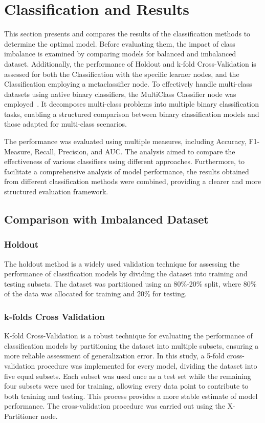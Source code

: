 \section{Classification and Results}
This section presents and compares the results of the classification methods to determine the optimal model. Before evaluating them, the impact of class imbalance is examined by comparing models for balanced and imbalanced dataset. Additionally, the performance of Holdout and k-fold Cross-Validation is assessed for both the Classification with the specific learner nodes, and the Classification employing a metaclassifier node. 
To effectively handle multi-class datasets using native binary classifiers, the MultiClass Classifier node was employed~\cite{multiclasswiki}. It decomposes multi-class problems into multiple binary classification tasks, enabling a structured comparison between binary classification models and those adapted for multi-class scenarios.

The performance was evaluated using multiple measures, including Accuracy, F1-Measure, Recall, Precision, and AUC. The analysis aimed to compare the effectiveness of various classifiers using different approaches.
Furthermore, to facilitate a comprehensive analysis of model performance, the results obtained from different classification methods were combined, providing a clearer and more structured evaluation framework.

\subsection{Comparison with Imbalanced Dataset}
\subsubsection{Holdout}
The holdout method is a widely used validation technique for assessing the performance of classification models by dividing the dataset into training and testing subsets. The dataset was partitioned using an 80\%-20\% split, where 80\% of the data was allocated for training and 20\% for testing.
\subsubsection{k-folds Cross Validation}
K-fold Cross-Validation is a robust technique for evaluating the performance of classification models by partitioning the dataset into multiple subsets, ensuring a more reliable assessment of generalization error. In this study, a 5-fold cross-validation procedure was implemented for every model, dividing the dataset into five equal subsets. Each subset was used once as a test set while the remaining four subsets were used for training, allowing every data point to contribute to both training and testing. This process provides a more stable estimate of model performance. The cross-validation procedure was carried out using the X-Partitioner node.
